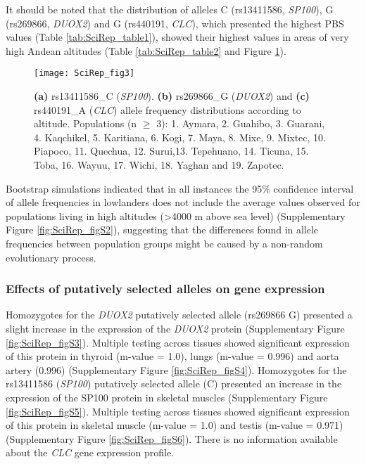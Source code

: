 It should be noted that the distribution of alleles C (rs13411586, \textsl{SP100}), G (rs269866, \textsl{DUOX2}) and G (rs440191, \textsl{CLC}), which presented the highest PBS values (Table \ref{tab:SciRep_table1}), showed their highest values in areas of very high Andean altitudes (Table \ref{tab:SciRep_table2} and Figure \ref{fig:SciRep_fig3}).



\begin{figure}[p] 
\noindent
\centering
\texttt{[image: SciRep\_fig3]}
\caption[Target allele frequencies in South America]{\textbf{(a)} rs13411586\_C (\textsl{SP100}). \textbf{(b)} rs269866\_G (\textsl{DUOX2}) and \textbf{(c)} rs440191\_A (\textsl{CLC}) allele frequency distributions according to altitude. Populations (n $\geq$ 3): 1. Aymara, 2. Guahibo, 3. Guarani, 4. Kaqchikel, 5. Karitiana, 6. Kogi, 7. Maya, 8. Mixe, 9. Mixtec, 10. Piapoco, 11. Quechua, 12. Surui,13. Tepehuano, 14. Ticuna, 15. Toba, 16. Wayuu, 17. Wichi, 18. Yaghan and 19. Zapotec.}
\label{fig:SciRep_fig3}
\end{figure}

\newpage

Bootstrap simulations indicated that in all instances the 95\% confidence interval of allele frequencies in lowlanders does not include the average values observed for populations living in high altitudes (>4000 m above sea level) (Supplementary Figure \ref{fig:SciRep_figS2}), suggesting that the differences found in allele frequencies between population groups might be caused by a non-random evolutionary process.

\subsubsection{Effects of putatively selected alleles on gene expression}

Homozygotes for the \textsl{DUOX2} putatively selected allele (rs269866 G) presented a slight increase in the expression of the \textsl{DUOX2} protein (Supplementary Figure \ref{fig:SciRep_figS3}). Multiple testing across tissues showed significant expression of this protein in thyroid (m-value = 1.0), lungs (m-value = 0.996) and aorta artery (0.996) (Supplementary Figure \ref{fig:SciRep_figS4}). Homozygotes for the rs13411586 (\textsl{SP100}) putatively selected allele (C) presented an increase in the expression of the SP100 protein in skeletal muscles (Supplementary Figure \ref{fig:SciRep_figS5}). Multiple testing across tissues showed significant expression of this protein in skeletal muscle (m-value = 1.0) and testis (m-value = 0.971) (Supplementary Figure \ref{fig:SciRep_figS6}). There is no information available about the \textsl{CLC} gene expression profile.


